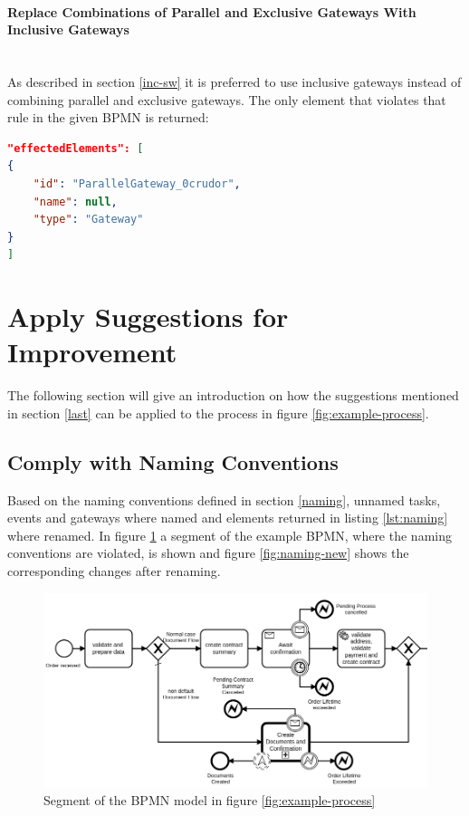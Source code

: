 \paragraph{Replace Combinations of Parallel and Exclusive Gateways With Inclusive Gateways}~\\
As described in section \ref{inc-sw} it is preferred to use inclusive gateways instead of combining parallel and exclusive gateways. The only element that violates that rule in the given BPMN is returned:
\begin{lstlisting}[language=json]
"effectedElements": [
{
	"id": "ParallelGateway_0crudor",
	"name": null,
	"type": "Gateway"
}
]
\end{lstlisting}
\section{Apply Suggestions for Improvement}\label{improvements}
The following section will give an introduction on how the suggestions mentioned in section \ref{last} can be applied to the process in figure \ref{fig:example-process}. 
\subsection{Comply with Naming Conventions}
Based on the naming conventions defined in section \ref{naming}, unnamed tasks, events and gateways where named and elements returned in listing \ref{lst:naming} where renamed. In figure \ref{fig:naming-org} a segment of the example BPMN, where the naming conventions are violated, is shown and figure \ref{fig:naming-new} shows the corresponding changes after renaming. 

\begin{figure}[H]
	\centering
	\includegraphics[width=0.9\columnwidth]{graphics/case-study-naming-org}
	\caption{Segment of the BPMN model in figure \ref{fig:example-process}}
	\label{fig:naming-org}
\end{figure}

